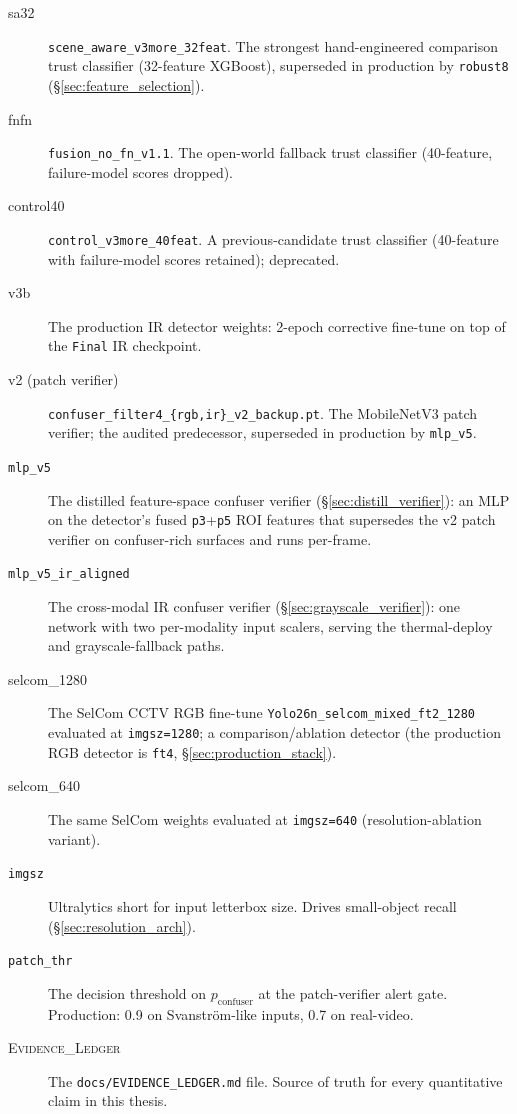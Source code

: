 \documentclass[12pt,a4paper,oneside,openright]{book}
\begin{document}
\begin{description}
    \item[sa32] \texttt{scene\_aware\_v3more\_32feat}. The strongest hand-engineered comparison trust classifier (32-feature XGBoost), superseded in production by \texttt{robust8} (\S\ref{sec:feature_selection}).
    \item[fnfn] \texttt{fusion\_no\_fn\_v1.1}. The open-world fallback trust classifier (40-feature, failure-model scores dropped).
    \item[control40] \texttt{control\_v3more\_40feat}. A previous-candidate trust classifier (40-feature with failure-model scores retained); deprecated.
    \item[v3b] The production IR detector weights: 2-epoch corrective fine-tune on top of the \texttt{Final} IR checkpoint.
    \item[v2 (patch verifier)] \texttt{confuser\_filter4\_\{rgb,ir\}\_v2\_backup.pt}. The MobileNetV3 patch verifier; the audited predecessor, superseded in production by \texttt{mlp\_v5}.
    \item[\texttt{mlp\_v5}] The distilled feature-space confuser verifier (\S\ref{sec:distill_verifier}): an MLP on the detector's fused \texttt{p3}+\texttt{p5} ROI features that supersedes the v2 patch verifier on confuser-rich surfaces and runs per-frame.
    \item[\texttt{mlp\_v5\_ir\_aligned}] The cross-modal IR confuser verifier (\S\ref{sec:grayscale_verifier}): one network with two per-modality input scalers, serving the thermal-deploy and grayscale-fallback paths.
    \item[selcom\_1280] The SelCom CCTV RGB fine-tune \texttt{Yolo26n\_selcom\_mixed\_ft2\_1280} evaluated at \texttt{imgsz=1280}; a comparison/ablation detector (the production RGB detector is \texttt{ft4}, \S\ref{sec:production_stack}).
    \item[selcom\_640] The same SelCom weights evaluated at \texttt{imgsz=640} (resolution-ablation variant).
    \item[\texttt{imgsz}] Ultralytics short for input letterbox size. Drives small-object recall (\S\ref{sec:resolution_arch}).
    \item[\texttt{patch\_thr}] The decision threshold on $p_\text{confuser}$ at the patch-verifier alert gate. Production: 0.9 on Svanstr\"om-like inputs, 0.7 on real-video.
    \item[\textsc{Evidence\_Ledger}] The \texttt{docs/EVIDENCE\_LEDGER.md} file. Source of truth for every quantitative claim in this thesis.
\end{description}

\backmatter
\sloppy
\printbibliography[heading=bibintoc, title=Bibliography]

\end{document}
